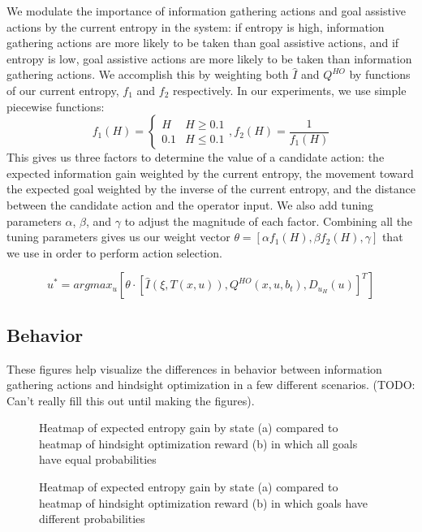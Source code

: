 \documentclass[conference]{IEEEtran}
\begin{document}
We modulate the importance of information gathering actions and goal assistive actions by the current entropy in the system: if entropy is high, information gathering actions are more likely to be taken than goal assistive actions, and if entropy is low, goal assistive actions are more likely to be taken than information gathering actions. We accomplish this by weighting both $\hat{I}$ and $Q^{HO}$ by functions of our current entropy, $f_1$ and $f_2$ respectively. In our experiments, we use simple piecewise functions:
\[
f_1(H) = 
\begin{cases}
H & H\geq 0.1 \\
0.1 & H\leq 0.1
\end{cases}
,f_2(H) = \frac{1}{f_1(H)}
\]
This gives us three factors to determine the value of a candidate action: the expected information gain weighted by the current entropy, the movement toward the expected goal weighted by the inverse of the current entropy, and the distance between the candidate action and the operator input. We also add tuning parameters $\alpha$, $\beta$, and $\gamma$ to adjust the magnitude of each factor. Combining all the tuning parameters gives us our weight vector $\theta = [\alpha f_1(H), \beta f_2(H), \gamma]$ that we use in order to perform action selection.

\[
u^* = argmax_u [ \theta \cdot [\hat{I}(\xi, T(x,u)), Q^{HO}(x,u,b_t), D_{u_H}(u)]^T ]
\]

\subsection{Behavior}

These figures help visualize the differences in behavior between information gathering actions and hindsight optimization in a few different scenarios. (TODO: Can't really fill this out until making the figures).

\begin{figure}
\caption{Heatmap of expected entropy gain by state (a) compared to heatmap of hindsight optimization reward (b) in which all goals have equal probabilities}
\label{heatmap1}
\end{figure}

\begin{figure}
\caption{Heatmap of expected entropy gain by state (a) compared to heatmap of hindsight optimization reward (b) in which goals have different probabilities}
\label{heatmap2}
\end{figure}
\end{document}
